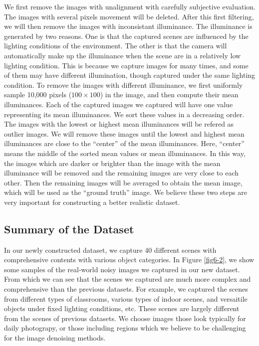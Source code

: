 We first remove the images with unalignment with carefully subjective evaluation. The images with several pixels movement will be deleted. After this first filtering, we will then remove the images with inconsistant illuminance. The illuminance is generated by two reasons. One is that the captured scenes are influenced by the lighting conditions of the environment. The other is that the camera will automatically make up the illuminance when the scene are in a relatively low lighting condition. This is because we capture images for many times, and some of them may have different illumination, though captured under the same lighting condition. To remove the images with different illuminance, we first uniformly sample 10,000 pixels ($100\times100$) in the image, and then compute their mean illuminances. Each of the captured images we captured will have one value representing its mean illuminances. We sort these values in a decreasing order. The images with the lowest or highest mean illuminances will be refered as outlier images. We will remove these images until the lowest and highest mean illuminances are close to the ``center'' of the mean illuminances. Here, ``center'' means the middle of the sorted mean values or mean illuminances. In this way, the images which are darker or brighter than the image with the mean illuminance will be removed and the remaining images are very close to each other. Then the remaining images will be averaged to obtain the mean image, which will be used as the ``ground truth'' image. We believe these two steps are very important for constructing a better realistic dataset.

\subsection{Summary of the Dataset}

In our newly constructed dataset, we capture 40 different scenes with comprehensive contents with various object categories. In Figure \ref{fig6-2}, we show some samples of the real-world noisy images we captured in our new dataset. From which we can see that the scenes we captured are much more complex and comprehensive than the previous datasets. For example, we captured the scenes from different types of classrooms, various types of indoor scenes, and versaitile objects under fixed lighting conditions, etc. These scenes are largely different from the scenes of previous datasets. We choose images those look typically for daily photograpy, or those including regions which we believe to be challenging for the image denoising methods. 

